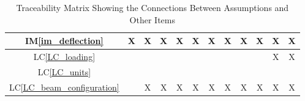 \documentclass[12pt]{article}
\newcommand{\iref}[1]{IM\ref{#1}}
\newcommand{\lcref}[1]{LC\ref{#1}}
\begin{document}
{\begin{landscape}
\begin{table}[H]
\begin{tabular}{|c|c|c|c|c|c|c|c|c|c|c|c|}
                \iref{im_deflection}          & X                      & X                   & X                     & X                                 & X                          & X                                   & X                            & X                            & X                      & X                                & X                         \\ \hline
                \lcref{LC_loading}            &                        &                     &                       &                                   &                            &                                     &                              &                              &                        & X                                & X                         \\ \hline
                \lcref{LC_units}              &                        &                     &                       &                                   &                            &                                     &                              &                              &                        &                                  &                           \\ \hline
                \lcref{LC_beam_configuration} &                        & X                   & X                     & X                                 & X                          & X                                   & X                            & X                            & X                      & X                                & X                         \\ \hline
            \end{tabular}
            \caption{Traceability Matrix Showing the Connections Between Assumptions and Other Items}
            \label{Table:A_trace}
        \end{table}
    \end{landscape}
}
\end{document}
